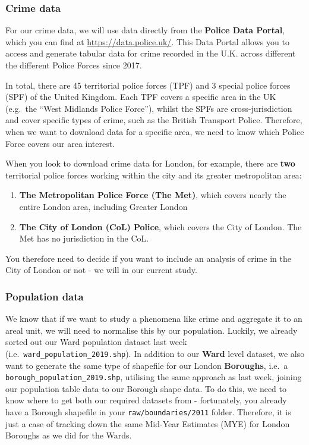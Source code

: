 \documentclass[
]{book}
\begin{document}
\hypertarget{crime-data}{%
\subsubsection{Crime data}\label{crime-data}}

For our crime data, we will use data directly from the \textbf{Police Data Portal}, which you can find at \url{https://data.police.uk/}. This Data Portal allows you to access and generate tabular data for crime recorded in the U.K. across different the different Police Forces since 2017.

In total, there are 45 territorial police forces (TPF) and 3 special police forces (SPF) of the United Kingdom. Each TPF covers a specific area in the UK (e.g.~the ``West Midlands Police Force''), whilst the SPFs are cross-jurisdiction and cover specific types of crime, such as the British Transport Police. Therefore, when we want to download data for a specific area, we need to know which Police Force covers our area interest.

When you look to download crime data for London, for example, there are \textbf{two} territorial police forces working within the city and its greater metropolitan area:

\begin{enumerate}
\def\labelenumi{\arabic{enumi})}
\item
  \textbf{The Metropolitan Police Force (The Met)}, which covers nearly the entire London area, including Greater London
\item
  \textbf{The City of London (CoL) Police}, which covers the City of London. The Met has no jurisdiction in the CoL.
\end{enumerate}

You therefore need to decide if you want to include an analysis of crime in the City of London or not - we will in our current study.

\hypertarget{population-data}{%
\subsubsection{Population data}\label{population-data}}

We know that if we want to study a phenomena like crime and aggregate it to an areal unit, we will need to normalise this by our population. Luckily, we already sorted out our Ward population dataset last week (i.e.~\texttt{ward\_population\_2019.shp}). In addition to our \textbf{Ward} level dataset, we also want to generate the same type of shapefile for our London \textbf{Boroughs}, i.e.~a \texttt{borough\_population\_2019.shp}, utilising the same approach as last week, joining our population table data to our Borough shape data. To do this, we need to know where to get both our required datasets from - fortunately, you already have a Borough shapefile in your \texttt{raw/boundaries/2011} folder. Therefore, it is just a case of tracking down the same Mid-Year Estimates (MYE) for London Boroughs as we did for the Wards.
\end{document}
